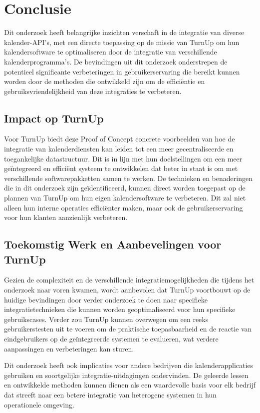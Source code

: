 
\chapter{Conclusie}%
\label{ch:conclusie}

Dit onderzoek heeft belangrijke inzichten verschaft in de integratie van diverse kalender-API's, met een directe toepassing op de missie van TurnUp om hun kalendersoftware te optimaliseren door de integratie van verschillende kalenderprogramma's. De bevindingen uit dit onderzoek onderstrepen de potentieel significante verbeteringen in gebruikerservaring die bereikt kunnen worden door de methoden die ontwikkeld zijn om de efficiëntie en gebruiksvriendelijkheid van deze integraties te verbeteren.

\section{Impact op TurnUp}
Voor TurnUp biedt deze Proof of Concept concrete voorbeelden van hoe de integratie van kalenderdiensten kan leiden tot een meer gecentraliseerde en toegankelijke datastructuur. Dit is in lijn met hun doelstellingen om een meer geïntegreerd en efficiënt systeem te ontwikkelen dat beter in staat is om met verschillende softwarepakketten samen te werken. De technieken en benaderingen die in dit onderzoek zijn geïdentificeerd, kunnen direct worden toegepast op de plannen van TurnUp om hun eigen kalendersoftware te verbeteren. Dit zal niet alleen hun interne operaties efficiënter maken, maar ook de gebruikerservaring voor hun klanten aanzienlijk verbeteren.

\section{Toekomstig Werk en Aanbevelingen voor TurnUp}
Gezien de complexiteit en de verschillende integratiemogelijkheden die tijdens het onderzoek naar voren kwamen, wordt aanbevolen dat TurnUp voortbouwt op de huidige bevindingen door verder onderzoek te doen naar specifieke integratietechnieken die kunnen worden geoptimaliseerd voor hun specifieke gebruikscases. Verder zou TurnUp kunnen overwegen om een reeks gebruikerstesten uit te voeren om de praktische toepasbaarheid en de reactie van eindgebruikers op de geïntegreerde systemen te evalueren, wat verdere aanpassingen en verbeteringen kan sturen.

Dit onderzoek heeft ook implicaties voor andere bedrijven die kalenderapplicaties gebruiken en soortgelijke integratie-uitdagingen ondervinden. De geleerde lessen en ontwikkelde methoden kunnen dienen als een waardevolle basis voor elk bedrijf dat streeft naar een betere integratie van heterogene systemen in hun operationele omgeving.

